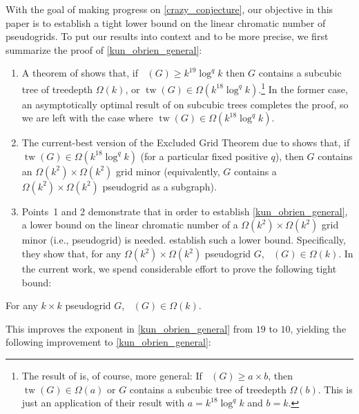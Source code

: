 \documentclass{patmorin}
\DeclareMathOperator{\tw}{tw}
\DeclareMathOperator{\chicen}{\chi_{\mathrm{cen}}}
\DeclareMathOperator{\chilin}{\chi_{\mathrm{lin}}}
\begin{document}
With the goal of making progress on \cref{crazy_conjecture}, our objective in this paper is to establish a tight lower bound on the linear chromatic number of pseudogrids. To put our results into context and to be more precise, we first summarize the proof of \cref{kun_obrien_general}:

\begin{enumerate}
  \item A theorem of \citet{czerwinski.nadara.ea:improved} shows that, if $\chicen(G)\ge k^{19}\log^{q} k$ then $G$ contains a subcubic tree of treedepth $\Omega(k)$, or $\tw(G)\in\Omega(k^{18}\log^q k)$.\footnote{The result of \citet{czerwinski.nadara.ea:improved} is, of course, more general:  If $\chicen(G)\ge a\times b$, then $\tw(G)\in\Omega(a)$ or $G$ contains a subcubic tree of treedepth $\Omega(b)$. This is just an application of their result with $a=k^{18}\log^q k$ and $b=k$.}  In the former case, an asymptotically optimal result of \citet{kun.obrien.ea:polynomial} on subcubic trees completes the proof, so we are left with the case where $\tw(G)\in\Omega(k^{18}\log^q k)$.

  \item The current-best version of the Excluded Grid Theorem due to \citet{chuzhoy.tan:towards} shows that, if $\tw(G)\in\Omega(k^{18}\log^q k)$ (for a particular fixed positive $q$), then $G$ contains an $\Omega(k^2)\times \Omega(k^2)$ grid minor (equivalently, $G$ contains a $\Omega(k^2)\times\Omega(k^2)$ pseudogrid as a subgraph).

  \item Points~1 and 2 demonstrate that in order to establish \cref{kun_obrien_general}, a lower bound on the linear chromatic number of a $\Omega(k^2)\times\Omega(k^2)$ grid minor (i.e., pseudogrid) is needed.  \citet[Lemma~5]{kun.obrien.ea:polynomial} establish such a lower bound. Specifically, they show that, for any $\Omega(k^2)\times \Omega(k^2)$ pseudogrid $G$, $\chilin(G)\in\Omega(k)$.
  In the current work, we spend considerable effort to prove the following tight bound:
\end{enumerate}


\begin{lem}\label{pseudogrid_lower_bound}
  For any $k\times k$ pseudogrid $G$, $\chilin(G)\in\Omega(k)$.
\end{lem}

This improves the exponent in \cref{kun_obrien_general} from $19$ to $10$, yielding the following improvement to \cref{kun_obrien_general}:
\end{document}

